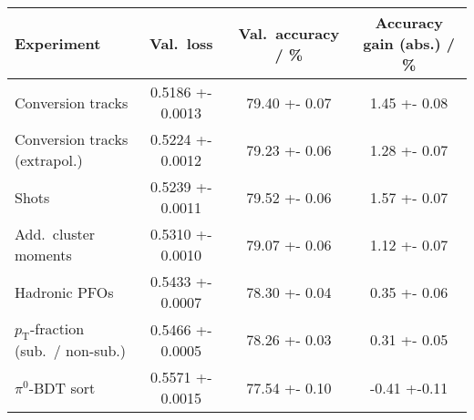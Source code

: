 \begin{tabular}{p{5cm}S[table-format=1.4(4)]S[table-format=2.2(2)]S[table-format=1.2(2)]}
  \toprule
  {Experiment} & {Val.\ loss} & {Val.\ accuracy / \si{\percent}} & {Accuracy gain (abs.) / \si{\percent}} \\
  \midrule
  Conversion tracks & 0.5186 +- 0.0013 & 79.40 +- 0.07 & 1.45 +- 0.08 \\
  Conversion tracks (extrapol.) & 0.5224 +- 0.0012 & 79.23 +- 0.06 & 1.28 +- 0.07 \\
  Shots & 0.5239 +- 0.0011 & 79.52 +- 0.06 &  1.57 +- 0.07 \\
  Add.\ cluster moments & 0.5310 +- 0.0010 & 79.07 +- 0.06 & 1.12 +- 0.07 \\
  Hadronic PFOs & 0.5433 +- 0.0007 & 78.30 +- 0.04 & 0.35 +- 0.06 \\
  $p_\text{T}$-fraction (sub.\ / non-sub.) & 0.5466 +- 0.0005 & 78.26 +- 0.03 & 0.31 +- 0.05 \\
  $\pi^0$-BDT sort & 0.5571 +- 0.0015 & 77.54 +- 0.10 & -0.41 +-0.11 \\
  \bottomrule
\end{tabular}

